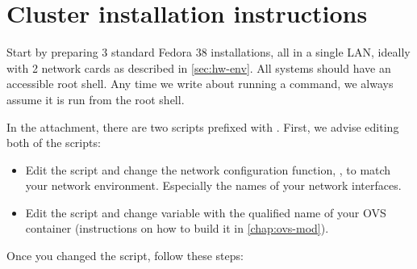 \chapter{Cluster installation instructions}
\label{chap:install}

Start by preparing 3 standard Fedora 38 installations, all in a single LAN, ideally with 2 network cards as described in \cref{sec:hw-env}. All systems should have an accessible root shell. Any time we write about running a command, we always assume it is run from the root shell.

In the attachment, there are two scripts prefixed with . First, we advise editing both of the scripts:

\begin{itemize}
    \item Edit the  script and change the network configuration function, , to match your network environment. Especially the names of your network interfaces.

    \item Edit the  script and change  variable with the qualified name of your OVS container (instructions on how to build it in \cref{chap:ovs-mod}).
\end{itemize}

Once you changed the script, follow these steps:

